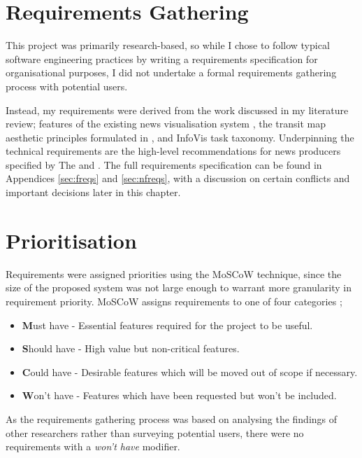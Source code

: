 \section{Requirements Gathering}
This project was primarily research-based, so while I chose to follow typical software engineering practices by writing a requirements specification for organisational purposes, I did not undertake a formal requirements gathering process with potential users.

Instead, my requirements were derived from the work discussed in my literature review; features of the existing news visualisation system \citep{GeneratingInformationMaps}, the transit map aesthetic principles formulated in \citep{AutomaticMetroMapLayoutThesis, AutomaticMetroMapLayout}, and  InfoVis task taxonomy. Underpinning the technical requirements are the high-level recommendations for news producers specified by The \cite{anewmodelfornews} and \cite{overloadjournalismsbattle}. The full requirements specification can be found in Appendices \ref{sec:freqs} and \ref{sec:nfreqs}, with a discussion on certain conflicts and important decisions later in this chapter.

\section{Prioritisation}
Requirements were assigned priorities using the MoSCoW technique, since the size of the proposed system was not large enough to warrant more granularity in requirement priority. MoSCoW assigns requirements to one of four categories \citep{PrioritizationUsingMoscow};
\begin{itemize}[noitemsep]
	\item\textbf{M}ust have - Essential features required for the project to be useful.
	\item\textbf{S}hould have - High value but non-critical features.
	\item\textbf{C}ould have - Desirable features which will be moved out of scope if necessary.
	\item\textbf{W}on't have - Features which have been requested but won't be included. 
\end{itemize}
As the requirements gathering process was based on analysing the findings of other researchers rather than surveying potential users, there were no requirements with a \textit{won't have} modifier.

